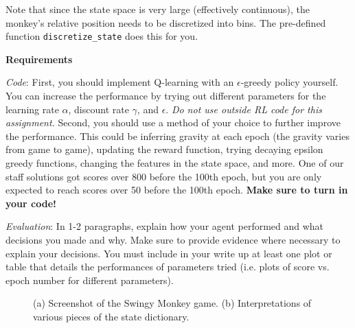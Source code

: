 \documentclass[submit]{harvardml}
\begin{document}
\begin{problem}
Note that since the state space is very large (effectively continuous), the monkey's relative position needs to be discretized into bins. The pre-defined function \verb|discretize_state| does this for you.

\textbf{Requirements}

\textit{Code}: First, you should implement Q-learning with an $\epsilon$-greedy policy yourself. You can increase the performance by trying out different parameters for the learning rate $\alpha$, discount rate $\gamma$, and $\epsilon$. \emph{Do not use outside RL code for this assignment.} Second, you should use a method of your choice to further improve the performance. This could be inferring gravity at each epoch (the gravity varies from game to game), updating the reward function, trying decaying epsilon greedy functions, changing the features in the state space, and more. One of our staff solutions got scores over 800 before the 100th epoch, but you are only expected to reach scores over 50 before the 100th epoch. {\bf Make sure to turn in your code!} 

\textit{Evaluation}: In 1-2 paragraphs, explain how your agent performed and what decisions you made and why. Make sure to provide evidence where necessary to explain your decisions. You must include in your write up at least one plot or table that details the performances of parameters tried (i.e. plots of score vs. epoch number for different parameters).
\end{problem}

\begin{figure}[H]
    \centering%
    \hfill
    \caption{(a) Screenshot of the Swingy Monkey game.  (b) Interpretations of various pieces of the state dictionary.}
\end{figure}
    
\end{document}
